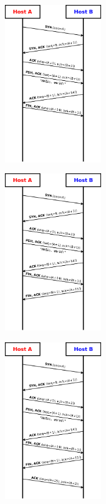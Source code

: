 \documentclass{beamer}
\begin{document}
\begin{frame}[allowframebreaks]{\insertsection}{\insertsubsection}
\begin{figure}
\end{figure}
\framebreak
\begin{figure}
\includegraphics[width=0.37\textwidth]{imgs/tcp-3-way-handshake-06.drawio.png}
\end{figure}
\framebreak
\begin{figure}
\includegraphics[width=0.37\textwidth]{imgs/tcp-3-way-handshake-07.drawio.png}
\end{figure}
\framebreak
\begin{figure}
\includegraphics[width=0.37\textwidth]{imgs/tcp-3-way-handshake-08.drawio.png}
\end{figure}
\end{frame}
\end{document}
